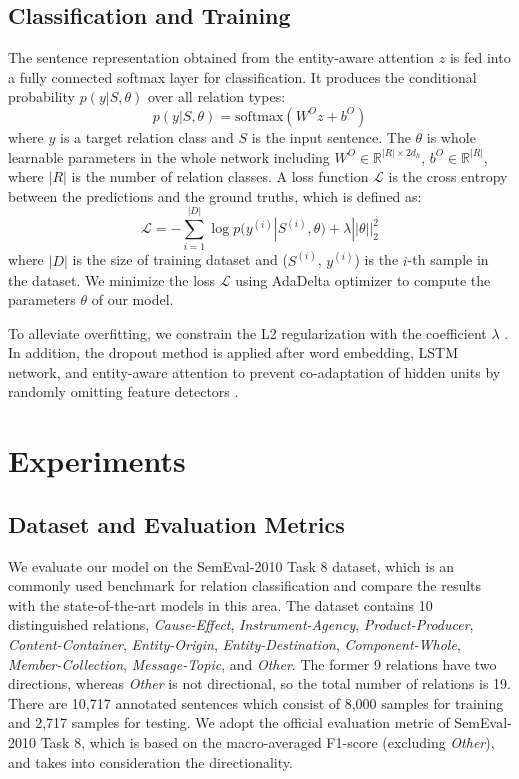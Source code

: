 \documentclass[twoside,leqno,twocolumn]{article}
\begin{document}
\subsection{Classification and Training}
The sentence representation obtained from the entity-aware attention $z$ is fed into a fully connected softmax layer for classification. It produces the conditional probability $p(y|S,\theta)$ over all relation types:
\begin{equation} 
p(y|S,\theta)=\text{softmax}(W^Oz+b^O)
\label{e3.12}
\end{equation}
where $y$ is a target relation class and $S$ is the input sentence. The $\theta$ is whole learnable parameters in the whole network including $W^O\in \mathbb{R}^{|R|\times 2d_h}$, $b^O\in \mathbb{R}^{|R|}$, where $|R|$ is the number of relation classes.
A loss function $\mathcal{L}$ is the cross entropy between the predictions and the ground truths, which is defined as:
\begin{equation} 
\mathcal{L}=-\sum_{i=1}^{|D|}\log p(y^{(i)}|S^{(i)},\theta) + \lambda||\theta||_2^2
\label{e3.13}
\end{equation}
where $|D|$ is the size of training dataset and ($S^{(i)}$, $y^{(i)}$) is the $i$-th sample in the dataset. We minimize the loss $\mathcal{L}$ using AdaDelta optimizer \cite{zeiler2012adadelta} to compute the parameters $\theta$ of our model.

To alleviate overfitting, we constrain the L2 regularization with the coefficient $\lambda$ \cite{ng2004feature}. 
In addition, the dropout method is applied after word embedding, LSTM network, and entity-aware attention to prevent co-adaptation of hidden units by randomly omitting feature detectors \cite{hinton2012improving, zaremba2014recurrent}.



\section{Experiments}

\subsection{Dataset and Evaluation Metrics}
We evaluate our model on the SemEval-2010 Task 8 dataset, which is an commonly used benchmark for relation classification \cite{hendrickx2009semeval} and compare the results with the state-of-the-art models in this area.
The dataset contains 10 distinguished relations, \textit{Cause-Effect}, \textit{Instrument-Agency}, \textit{Product-Producer}, \textit{Content-Container}, \textit{Entity-Origin}, \textit{Entity-Destination}, \textit{Component-Whole}, \textit{Member-Collection}, \textit{Message-Topic}, and \textit{Other}.
The former 9 relations have two directions, whereas \textit{Other} is not directional, so the total number of relations is 19.
There are 10,717 annotated sentences which consist of 8,000 samples for training and 2,717 samples for testing.
We adopt the official evaluation metric of SemEval-2010 Task 8, which is based on the macro-averaged F1-score (excluding \textit{Other}), and takes into consideration the directionality.
\end{document}
